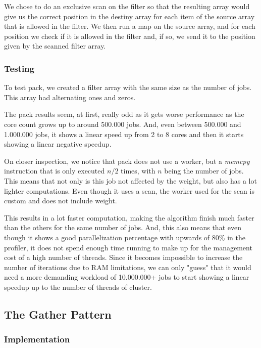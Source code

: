 \documentclass[10pt,journal]{IEEEtran}
\begin{document}
We chose to do an exclusive scan on the filter so that the resulting array would give us the correct position in the destiny array for each item of the source array that is allowed in the filter. We then run a map on the source array, and for each position we check if it is allowed in the filter and, if so, we send it to the position given by the scanned filter array.

\subsubsection{Testing}

To test pack, we created a filter array with the same size as the number of jobs. This array had alternating ones and zeros.

The pack results seem, at first, really odd as it gets worse performance as the core count grows up to around 500.000 jobs. And, even between 500.000 and 1.000.000 jobs, it shows a linear speed up from 2 to 8 cores and then it starts showing a linear negative speedup.

On closer inspection, we notice that pack does not use a worker, but a \textit{memcpy} instruction that is only executed $ n / 2 $ times, with $ n $ being the number of jobs. This means that not only is this job not affected by the weight, but also has a lot lighter computations. Even though it uses a scan, the worker used for the scan is custom and does not include weight.

This results in a lot faster computation, making the algorithm finish much faster than the others for the same number of jobs. And, this also means that even though it shows a good parallelization percentage with upwards of 80\% in the profiler, it does not spend enough time running to make up for the management cost of a high number of threads. Since it becomes impossible to increase the number of iterations due to RAM limitations, we can only "guess" that it would need a more demanding workload of 10.000.000+ jobs to start showing a linear speedup up to the number of threads of cluster.

\subsection{The Gather Pattern}
\label{gather}

\subsubsection{Implementation}
\end{document}
